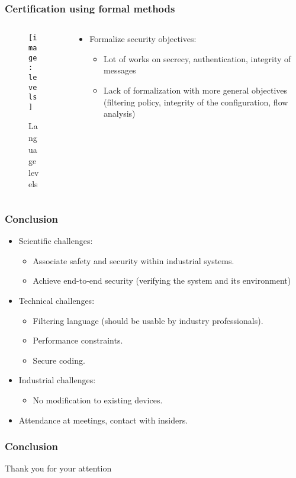 \documentclass{beamer}
\begin{document}
\begin{frame}
    \frametitle{Certification using formal methods}

    \begin{columns}[c]
        \begin{column}{.4\textwidth}
            \begin{figure}
                \centering
                \texttt{[image: levels]}
                \caption{Language levels}
            \end{figure}
        \end{column}
        \begin{column}{.6\textwidth}
            \begin{itemize}
                \item Formalize security objectives:
                    \vfill
                \begin{itemize}
                    \item Lot of works on secrecy, authentication, integrity of messages
                        \vfill
                    \item Lack of formalization with more general objectives (filtering policy, integrity of the configuration, flow analysis)
                \end{itemize}
            \end{itemize}
        \end{column}
    \end{columns}
\end{frame}

\begin{frame}
    \frametitle{Conclusion}

    \begin{itemize}
        \item Scientific challenges:
        \begin{itemize}
            \item Associate safety and security within industrial systems.
            \item Achieve end-to-end security (verifying the system and its environment)
        \end{itemize}
            \vfill
        \item Technical challenges: 
        \begin{itemize}
            \item Filtering language (should be usable by industry professionals).
            \item Performance constraints.
            \item Secure coding.
        \end{itemize}
            \vfill
        \item Industrial challenges: 
        \begin{itemize}
            \item No modification to existing devices.
        \end{itemize}
            \vfill
        \item Attendance at meetings, contact with insiders.
    \end{itemize}
\end{frame}

\begin{frame}
    \frametitle{Conclusion}

    \begin{center}
        Thank you for your attention
    \end{center}
\end{frame}
\end{document}
